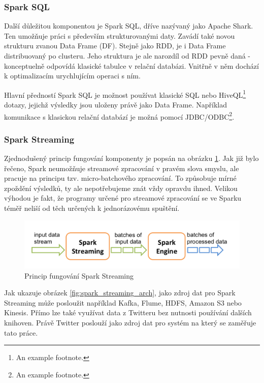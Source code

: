 \documentclass[thesis=B,czech]{FITthesis}[2012/06/26]
\begin{document}
\subsubsection{Spark SQL}
	Další důležitou komponentou je Spark SQL, dříve nazývaný jako Apache Shark. Ten umožňuje práci s především strukturovanými daty. Zavádí také novou strukturu zvanou Data Frame (DF). Stejně jako RDD, je i Data Frame distribuovaný po clusteru. Jeho struktura je ale narozdíl od RDD pevně daná - konceptuelně odpovídá klasické tabulce v relační databázi. Vnitřně v něm dochází k optimalizacím urychlujícím operaci s ním. 
	
	Hlavní předností Spark SQL je možnost používat klasické SQL nebo HiveQL\footnote{An example footnote.} dotazy, jejichž výsledky jsou uloženy právě jako Data Frame. Například komunikace s klasickou relační databází je možná pomocí JDBC/ODBC\footnote{An example footnote.}. 


\subsubsection{Spark Streaming}
	Zjednodušený princip fungování komponenty je popsán na obrázku \ref{fig:spark_streaming_flow}. Jak již bylo řečeno, Spark neumožňuje streamové zpracování v pravém slova smyslu, ale pracuje na principu tzv. micro-batchového zpracování. To způsobuje mírné zpoždění výsledků, ty ale nepotřebujeme znát vždy opravdu ihned. Velikou výhodou je fakt, že programy určené pro streamové zpracování se ve Sparku téměř neliší od těch určených k jednorázovému spuštění. 

	\begin{figure}[ht]
    	\centering
    	\includegraphics[width=1\textwidth]{images/spark-streaming-flow.png}
    	\caption{Princip fungování Spark Streaming\cite{streaming-guide}}
    	\label{fig:spark_streaming_flow}
	\end{figure}
	
	Jak ukazuje obrázek \ref{fig:spark_streaming_arch}, jako zdroj dat pro Spark Streaming může posloužit například Kafka, Flume, HDFS, Amazon S3 nebo Kinesis. Přímo lze také využívat data z Twitteru bez nutnosti používání dalších knihoven. Právě Twitter poslouží jako zdroj dat pro systém na který se zaměřuje tato práce.  
\end{document}

